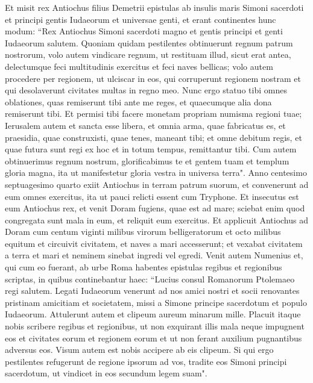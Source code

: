 \begin{biblechapter}  
\verse Et misit rex Antiochus filius Demetrii epistulas ab insulis maris Simoni sacerdoti et principi gentis Iudaeorum et universae genti, 
\verse et erant continentes hunc modum: “Rex Antiochus Simoni sacerdoti magno et gentis principi et genti Iudaeorum salutem. 
\verse Quoniam quidam pestilentes obtinuerunt regnum patrum nostrorum, volo autem vindicare regnum, ut restituam illud, sicut erat antea, delectumque feci multitudinis exercitus et feci naves bellicas; 
\verse volo autem procedere per regionem, ut ulciscar in eos, qui corruperunt regionem nostram et qui desolaverunt civitates multas in regno meo.  
\verse Nunc ergo statuo tibi omnes oblationes, quas remiserunt tibi ante me reges, et quaecumque alia dona remiserunt tibi. 
\verse Et permisi tibi facere monetam propriam numisma regioni tuae; 
\verse Ierusalem autem et sancta esse libera, et omnia arma, quae fabricatus es, et praesidia, quae construxisti, quae tenes, maneant tibi; 
\verse et omne debitum regis, et quae futura sunt regi ex hoc et in totum tempus, remittantur tibi. 
\verse Cum autem obtinuerimus regnum nostrum, glorificabimus te et gentem tuam et templum gloria magna, ita ut manifestetur gloria vestra in universa terra". 
\verse Anno centesimo septuagesimo quarto exiit Antiochus in terram patrum suorum, et convenerunt ad eum omnes exercitus, ita ut pauci relicti essent cum Tryphone. 
\verse Et insecutus est eum Antiochus rex, et venit Doram fugiens, quae est ad mare; 
\verse sciebat enim quod congregata sunt mala in eum, et reliquit eum exercitus.  
\verse Et applicuit Antiochus ad Doram cum centum viginti milibus virorum belligeratorum et octo milibus equitum 
\verse et circuivit civitatem, et naves a mari accesserunt; et vexabat civitatem a terra et mari et neminem sinebat ingredi vel egredi. 
\verse Venit autem Numenius et, qui cum eo fuerant, ab urbe Roma habentes epistulas regibus et regionibus scriptas, in quibus continebantur haec: 
\verse “Lucius consul Romanorum Ptolemaeo regi salutem. 
\verse Legati Iudaeorum venerunt ad nos amici nostri et socii renovantes pristinam amicitiam et societatem, missi a Simone principe sacerdotum et populo Iudaeorum. 
\verse Attulerunt autem et clipeum aureum minarum mille. 
\verse Placuit itaque nobis scribere regibus et regionibus, ut non exquirant illis mala neque impugnent eos et civitates eorum et regionem eorum et ut non ferant auxilium pugnantibus adversus eos. 
\verse Visum autem est nobis accipere ab eis clipeum. 
\verse Si qui ergo pestilentes refugerunt de regione ipsorum ad vos, tradite eos Simoni principi sacerdotum, ut vindicet in eos secundum legem suam". 

\end{biblechapter}
